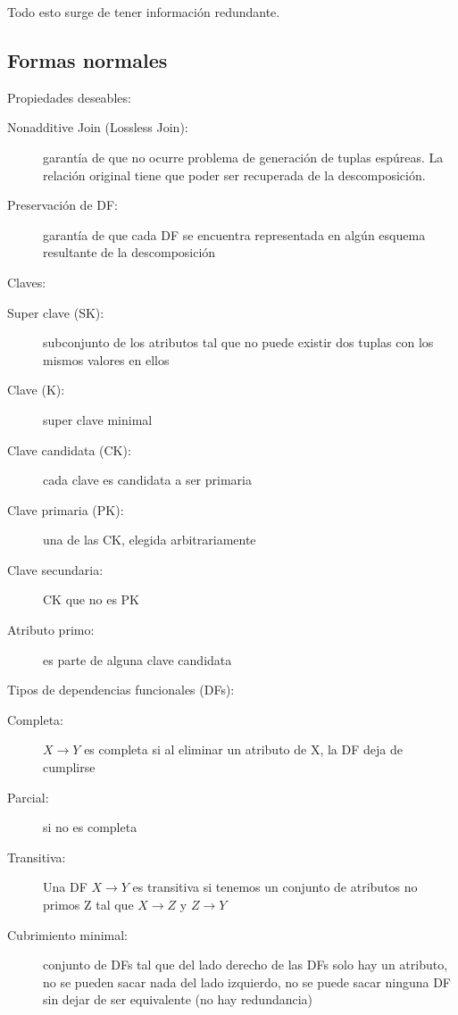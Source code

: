 Todo esto surge de tener información redundante.

\subsection{Formas normales}

Propiedades deseables:

\begin{description}
	\item[Nonadditive Join (Lossless Join):] garantía de que no ocurre problema de
generación de tuplas espúreas. La relación original tiene que poder ser
recuperada de la descomposición.
	\item[Preservación de DF:] garantía de que cada DF se encuentra representada en algún esquema resultante de la descomposición
\end{description}

Claves:

\begin{description}
	\item[Super clave (SK):] subconjunto de los atributos tal que no puede existir dos tuplas con los mismos valores en ellos
	\item[Clave (K):] super clave minimal
	\item[Clave candidata (CK):] cada clave es candidata a ser primaria
	\item[Clave primaria (PK):] una de las CK, elegida arbitrariamente
	\item[Clave secundaria:] CK que no es PK
	\item[Atributo primo:] es parte de alguna clave candidata
\end{description}

Tipos de dependencias funcionales (DFs):

\begin{description}
	\item[Completa:] $X \to Y$ es completa si al eliminar un atributo de X, la DF deja de cumplirse
	\item[Parcial:] si no es completa
	\item[Transitiva:] Una DF $X \to Y$ es transitiva si tenemos un conjunto de atributos no primos Z tal que $X \to Z$ y $Z \to Y$
	\item[Cubrimiento minimal:] conjunto de DFs tal que del lado derecho de las DFs solo hay un atributo, no se pueden sacar nada del lado izquierdo, no se puede sacar ninguna DF sin dejar de ser equivalente (no hay redundancia)
\end{description}

